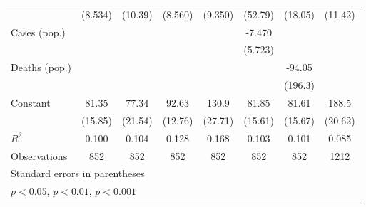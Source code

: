 \documentclass{article}
\begin{document}
{\begin{longtable}{l*{7}{c}}
                &  (8.534)         &  (10.39)         &  (8.560)         &  (9.350)         &  (52.79)         &  (18.05)         &  (11.42)         \\
Cases (pop.)    &                  &                  &                  &                  &   -7.470         &                  &                  \\
                &                  &                  &                  &                  &  (5.723)         &                  &                  \\
Deaths (pop.)   &                  &                  &                  &                  &                  &   -94.05         &                  \\
                &                  &                  &                  &                  &                  &  (196.3)         &                  \\
Constant        &    81.35\sym{**} &    77.34\sym{*}  &    92.63\sym{***}&    130.9\sym{**} &    81.85\sym{**} &    81.61\sym{**} &    188.5\sym{***}\\
                &  (15.85)         &  (21.54)         &  (12.76)         &  (27.71)         &  (15.61)         &  (15.67)         &  (20.62)         \\
\hline
\(R^{2}\)       &    0.100         &    0.104         &    0.128         &    0.168         &    0.103         &    0.101         &    0.085         \\
Observations    &      852         &      852         &      852         &      852         &      852         &      852         &     1212         \\
\hline\hline
\multicolumn{8}{l}{\footnotesize Standard errors in parentheses}\\
\multicolumn{8}{l}{\footnotesize \sym{*} \(p<0.05\), \sym{**} \(p<0.01\), \sym{***} \(p<0.001\)}\\
\end{longtable}
}
\end{document}
